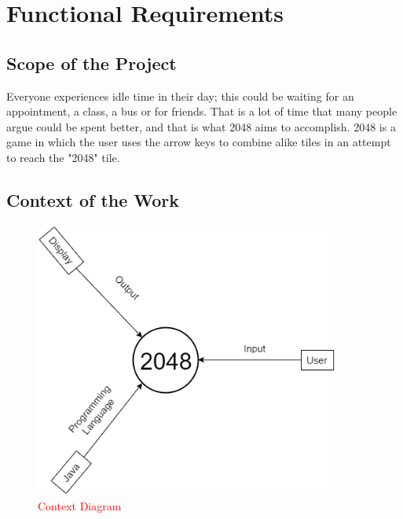 \documentclass[12pt]{article}
\begin{document}
\section{Functional Requirements}
\subsection{Scope of the Project}
Everyone experiences idle time in their day; this could be waiting for an appointment, a class, a bus or for friends. That is a lot of time that many people argue could be spent better, and that is what 2048 aims to accomplish. 2048 is a game in which the user uses the arrow keys to combine alike tiles in an attempt to reach the "2048" tile.\\

\subsection{\color{red}Context of the Work}

\begin{figure}[H]
    \color{red}
	\centering
	\includegraphics[width = 10cm]{context_diagram}
	\caption{\textcolor{red}{Context Diagram}}
	\label{Context Diagram}
\end{figure}
\end{document}
